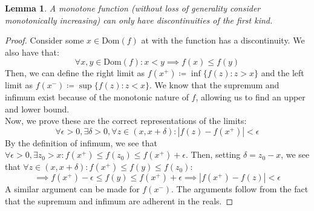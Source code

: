 \documentclass[10pt,letterpaper]{article} %
\newtheorem{lem}{Lemma}[section]
\begin{document}
\begin{lem}
A monotone function (without loss of generality consider monotonically increasing) can only have discontinuities of the first kind.
\end{lem}
\begin{proof}
Consider some $x \in \text{Dom}(f)$ at with the function has a discontinuity. We also have that:
\begin{equation*}
\forall x, y \in \text{Dom}(f): x < y \implies f(x) \leqslant f(y)
\end{equation*}
Then, we can define the right limit as $f(x^+) \coloneq \inf\{f(z): z > x\}$ and the left limit as $f(x^-) \coloneq \sup\{f(z): z < x\}$. We know that the supremum and infimum exist because of the monotonic nature of $f$, allowing us to find an upper and lower bound.\\

Now, we prove these are the correct representations of the limits:
\begin{equation*}
\forall \epsilon > 0, \exists \delta > 0, \forall z \in (x, x+\delta): |f(z) - f(x^+)| < \epsilon
\end{equation*}
By the definition of infimum, we see that $\forall \epsilon > 0, \exists z_0 > x: f(x^+) \leqslant f(z_0) \leqslant f(x^+) + \epsilon$. Then, setting $\delta = z_0 - x$, we see that $\forall z \in (x, x+\delta): f(x^+) \leqslant f(y) \leqslant f(z_0)$:
\begin{equation*}
\implies f(x^+) - \epsilon \leqslant f(y) \leqslant f(x^+) + \epsilon \implies |f(x^+) - f(z)| < \epsilon
\end{equation*}
A similar argument can be made for $f(x^-)$. The arguments follow from the fact that the supremum and infimum are adherent in the reals.
\end{proof}
\end{document}
